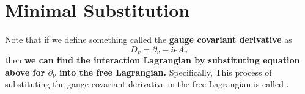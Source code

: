 \section{Minimal Substitution}
Note that if we define something called the \textbf{gauge covariant derivative} as
\begin{equation}
D_{v}=\partial_{v}-i e A_{v}
\end{equation}
then \textbf{we can find the interaction Lagrangian by substituting equation above for $\partial_{\nu}$ into the free Lagrangian.} Specifically, This process of substituting the gauge covariant derivative in the free Lagrangian is called .
